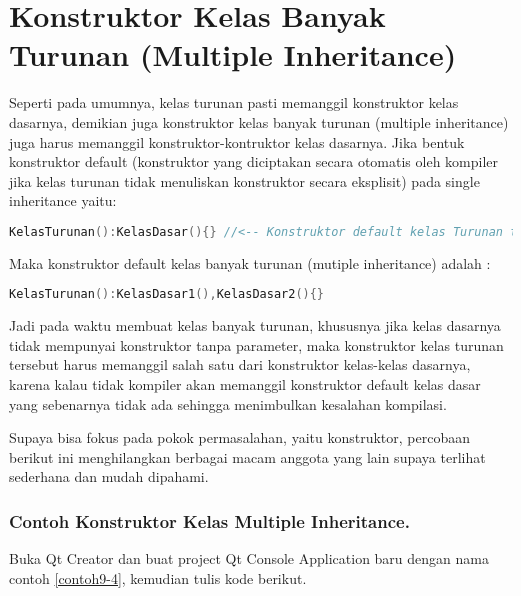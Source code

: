\section{Konstruktor Kelas Banyak Turunan (Multiple Inheritance)}\label{konstruktor-kelas-banyak-turunan-multiple-inheritance}

Seperti pada umumnya, kelas turunan pasti memanggil konstruktor kelas
dasarnya, demikian juga konstruktor kelas banyak turunan (multiple
inheritance) juga harus memanggil konstruktor-kontruktor kelas dasarnya.
Jika bentuk konstruktor default (konstruktor yang diciptakan secara
otomatis oleh kompiler jika kelas turunan tidak menuliskan konstruktor
secara eksplisit) pada single inheritance yaitu:

\begin{lstlisting}[language=c++, numbers=none]
KelasTurunan():KelasDasar(){} //<-- Konstruktor default kelas Turunan tunggal
\end{lstlisting}

Maka konstruktor default kelas banyak turunan (mutiple inheritance)
adalah :

\begin{lstlisting}[language=c++, numbers=none]
KelasTurunan():KelasDasar1(),KelasDasar2(){}
\end{lstlisting}

Jadi pada waktu membuat kelas banyak turunan, khususnya jika kelas
dasarnya tidak mempunyai konstruktor tanpa parameter, maka konstruktor
kelas turunan tersebut harus memanggil salah satu dari konstruktor
kelas-kelas dasarnya, karena kalau tidak kompiler akan memanggil
konstruktor default kelas dasar yang sebenarnya tidak ada sehingga
menimbulkan kesalahan kompilasi.

Supaya bisa fokus pada pokok permasalahan, yaitu konstruktor, percobaan
berikut ini menghilangkan berbagai macam anggota yang lain supaya
terlihat sederhana dan mudah dipahami.

\subsubsection*{Contoh  Konstruktor Kelas Multiple Inheritance.}

Buka Qt Creator dan buat project Qt Console Application baru dengan nama
contoh \ref{contoh9-4}, kemudian tulis kode berikut.





